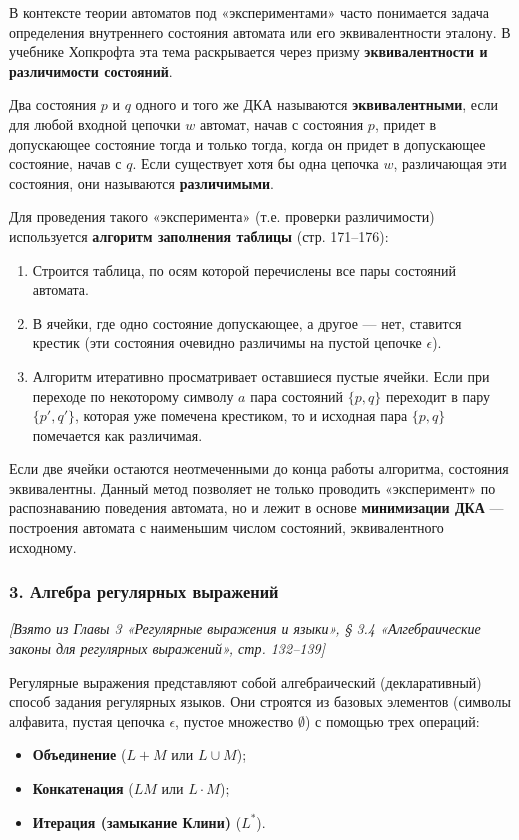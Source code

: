 \documentclass[a4paper,12pt]{article}
\begin{document}
В контексте теории автоматов под «экспериментами» часто понимается задача определения внутреннего состояния автомата или его эквивалентности эталону. В учебнике Хопкрофта эта тема раскрывается через призму \textbf{эквивалентности и различимости состояний}.

Два состояния \(p\) и \(q\) одного и того же ДКА называются \textbf{эквивалентными}, если для любой входной цепочки \(w\) автомат, начав с состояния \(p\), придет в допускающее состояние тогда и только тогда, когда он придет в допускающее состояние, начав с \(q\). Если существует хотя бы одна цепочка \(w\), различающая эти состояния, они называются \textbf{различимыми}.

Для проведения такого «эксперимента» (т.е. проверки различимости) используется \textbf{алгоритм заполнения таблицы} (стр. 171–176):
\begin{enumerate}
    \item Строится таблица, по осям которой перечислены все пары состояний автомата.
    \item В ячейки, где одно состояние допускающее, а другое — нет, ставится крестик (эти состояния очевидно различимы на пустой цепочке \(\epsilon\)).
    \item Алгоритм итеративно просматривает оставшиеся пустые ячейки. Если при переходе по некоторому символу \(a\) пара состояний \(\{p, q\}\) переходит в пару \(\{p', q'\}\), которая уже помечена крестиком, то и исходная пара \(\{p, q\}\) помечается как различимая.
\end{enumerate}
Если две ячейки остаются неотмеченными до конца работы алгоритма, состояния эквивалентны. Данный метод позволяет не только проводить «эксперимент» по распознаванию поведения автомата, но и лежит в основе \textbf{минимизации ДКА} — построения автомата с наименьшим числом состояний, эквивалентного исходному.

\subsubsection*{3. Алгебра регулярных выражений}
\textit{[Взято из Главы 3 «Регулярные выражения и языки», § 3.4 «Алгебраические законы для регулярных выражений», стр. 132–139]}

Регулярные выражения представляют собой алгебраический (декларативный) способ задания регулярных языков. Они строятся из базовых элементов (символы алфавита, пустая цепочка \(\epsilon\), пустое множество \(\emptyset\)) с помощью трех операций:
\begin{itemize}
    \item \textbf{Объединение} (\(L + M\) или \(L \cup M\));
    \item \textbf{Конкатенация} (\(LM\) или \(L \cdot M\));
    \item \textbf{Итерация (замыкание Клини)} (\(L^*\)).
\end{itemize}
\end{document}
